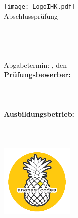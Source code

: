 

\begin{titlepage}
  \pagestyle{empty}    %
  \thispagestyle{empty}

  \begin{center}
    \vspace*{\fill}
    \begin{minipage}{0.9\textwidth}
      \centering

      \texttt{[image: LogoIHK.pdf]}\\[1ex]
      \Large{Abschlussprüfung \pruefungstermin}\\[3ex]

      \Large{\ausbildungsberuf}\\
      \LARGE{\betreff}\\[4ex]

      \huge{\textbf{\titel}}\\[1.5ex]
      \Large{\textbf{\untertitel}}\\[4ex]

      \normalsize
      Abgabetermin: \abgabeOrt, den \abgabeTermin\\[3em]
      \textbf{Prüfungsbewerber:}\\
      \autorName\\
      \autorAnschrift\\
      \autorOrt\\[5ex]

      \textbf{Ausbildungsbetrieb:}\\
      \betriebName\\
      \betriebAnschrift\\
      \betriebOrt\\[5em]

      \includegraphics[height=35mm]{Bilder/ananas_codes.png}\\[2ex]
    \end{minipage}
    \vspace*{\fill}
  \end{center}

  \thispagestyle{empty}
\end{titlepage}

\restoregeometry
